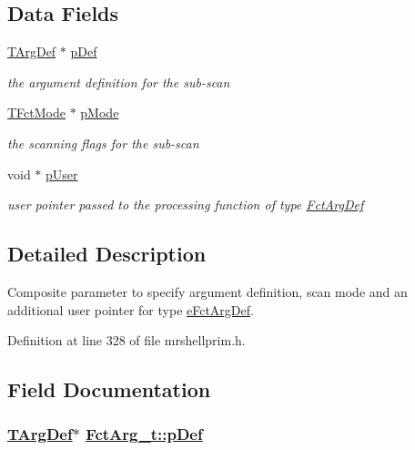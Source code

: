 \subsection*{Data Fields}
\begin{CompactItemize}
\item 
\hyperlink{structArgDef__t}{TArg\-Def} $\ast$ \hyperlink{structFctArg__t_59b99d7d99fff17580f67552428c3c98}{p\-Def}
\begin{CompactList}\small\item\em the argument definition for the sub-scan \item\end{CompactList}\item 
\hyperlink{structFctMode__t}{TFct\-Mode} $\ast$ \hyperlink{structFctArg__t_b84bb7d22c66809af5f97b860c3f818e}{p\-Mode}
\begin{CompactList}\small\item\em the scanning flags for the sub-scan \item\end{CompactList}\item 
void $\ast$ \hyperlink{structFctArg__t_9369def59ef9b0c2510fe77f075c8bca}{p\-User}
\begin{CompactList}\small\item\em user pointer passed to the processing function of type \hyperlink{mrshellprim_8h_1c9f7567aaf5693ef8473ff91ccb8ff5}{Fct\-Arg\-Def} \item\end{CompactList}\end{CompactItemize}


\subsection{Detailed Description}
Composite parameter to specify argument definition, scan mode and an additional user pointer for type \hyperlink{mrshellprim_8h_76a810650461f2062938ee9b82666b3607fd24779fbb8e0bc12b8241e0e436cc}{e\-Fct\-Arg\-Def}. 



Definition at line 328 of file mrshellprim.h.

\subsection{Field Documentation}
\hypertarget{structFctArg__t_59b99d7d99fff17580f67552428c3c98}{
\subsubsection[pDef]{\setlength{\rightskip}{0pt plus 5cm}\hyperlink{structArgDef__t}{TArg\-Def}$\ast$ \hyperlink{structFctArg__t_59b99d7d99fff17580f67552428c3c98}{Fct\-Arg\_\-t::p\-Def}}}
\label{structFctArg__t_59b99d7d99fff17580f67552428c3c98}


